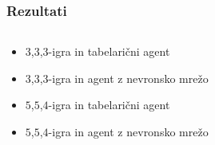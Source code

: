 \documentclass{beamer}    %
\begin{document}
\begin{frame}
    \frametitle{Rezultati}
    \begin{columns}
        \begin{column}{5.5cm}
            \begin{itemize}
                \item<1-> $3$,$3$,$3$-igra in tabelarični agent
                \item<2-> $3$,$3$,$3$-igra in agent z nevronsko mrežo
                \item<3-> $5$,$5$,$4$-igra in tabelarični agent
                \item<4-> $5$,$5$,$4$-igra in agent z nevronsko mrežo
            \end{itemize}
        \end{column}


\end{columns}
\end{frame}
\end{document}
